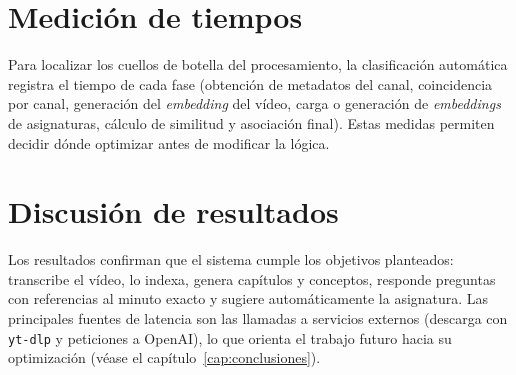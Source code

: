 \section{Medición de tiempos}

Para localizar los cuellos de botella del procesamiento, la clasificación automática registra el
tiempo de cada fase (obtención de metadatos del canal, coincidencia por canal, generación del
\textit{embedding} del vídeo, carga o generación de \textit{embeddings} de asignaturas, cálculo de
similitud y asociación final). Estas medidas permiten decidir dónde optimizar antes de modificar la
lógica.


\section{Discusión de resultados}

Los resultados confirman que el sistema cumple los objetivos planteados: transcribe el vídeo,
lo indexa, genera capítulos y conceptos, responde preguntas con referencias al minuto exacto y
sugiere automáticamente la asignatura. Las principales fuentes de latencia son las llamadas a
servicios externos (descarga con \texttt{yt-dlp} y peticiones a OpenAI), lo que orienta el trabajo
futuro hacia su optimización (véase el capítulo~\ref{cap:conclusiones}).
